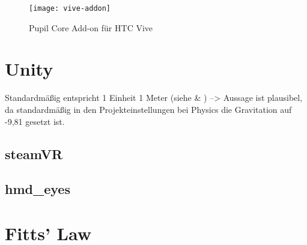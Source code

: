 
\begin{figure}[!htbp]
	\centering
	\texttt{[image: vive-addon]}
	\caption[Pupil Core Add-on für HTC Vive]{Pupil Core Add-on für HTC Vive \cite{PupilLabsAddOn}}
	\label{fig:pupil_labs_addon}
\end{figure}

\section{Unity}
Standardmäßig entspricht 1 Einheit 1 Meter (siehe \cite{BrentAllard.2017} \& \cite{AVividLight.2010}) --> Aussage ist plausibel, da standardmäßig in den Projekteinstellungen bei Physics die Gravitation auf -9,81 gesetzt ist.

\subsection{steamVR}

\subsection{hmd\_eyes}

\section{Fitts' Law}
